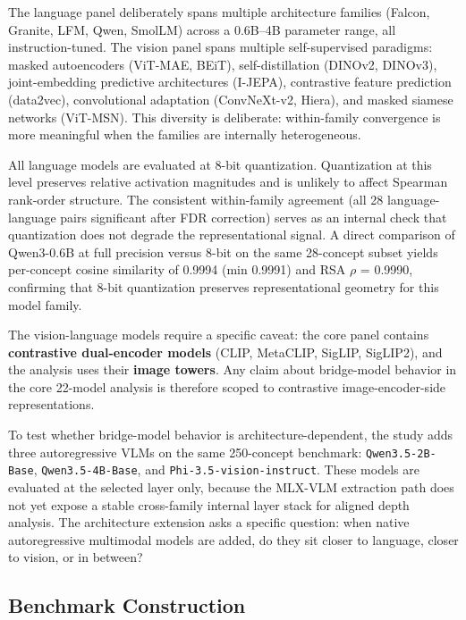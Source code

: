 \documentclass[10pt]{article}
\begin{document}
The language panel deliberately spans multiple architecture families
(Falcon, Granite, LFM, Qwen, SmolLM) across a 0.6B--4B parameter range,
all instruction-tuned. The vision panel spans multiple self-supervised
paradigms: masked autoencoders (ViT-MAE, BEiT), self-distillation
(DINOv2, DINOv3), joint-embedding predictive architectures (I-JEPA),
contrastive feature prediction (data2vec), convolutional adaptation
(ConvNeXt-v2, Hiera), and masked siamese networks (ViT-MSN). This
diversity is deliberate: within-family convergence is more meaningful
when the families are internally heterogeneous.

All language models are evaluated at 8-bit quantization. Quantization at
this level preserves relative activation magnitudes and is unlikely to
affect Spearman rank-order structure. The consistent within-family
agreement (all 28 language-language pairs significant after FDR
correction) serves as an internal check that quantization does not
degrade the representational signal. A direct comparison of Qwen3-0.6B
at full precision versus 8-bit on the same 28-concept subset yields
per-concept cosine similarity of 0.9994 (min 0.9991) and RSA \(\rho\) =
0.9990, confirming that 8-bit quantization preserves representational
geometry for this model family.

The vision-language models require a specific caveat: the core panel
contains \textbf{contrastive dual-encoder models} (CLIP, MetaCLIP,
SigLIP, SigLIP2), and the analysis uses their \textbf{image towers}. Any
claim about bridge-model behavior in the core 22-model analysis is
therefore scoped to contrastive image-encoder-side representations.

To test whether bridge-model behavior is architecture-dependent, the
study adds three autoregressive VLMs on the same 250-concept benchmark:
\texttt{Qwen3.5-2B-Base}, \texttt{Qwen3.5-4B-Base}, and
\texttt{Phi-3.5-vision-instruct}. These models are evaluated at the
selected layer only, because the MLX-VLM extraction path does not yet
expose a stable cross-family internal layer stack for aligned depth
analysis. The architecture extension asks a specific question: when
native autoregressive multimodal models are added, do they sit closer to
language, closer to vision, or in between?

\subsection{Benchmark Construction}\label{benchmark-construction}
\end{document}
